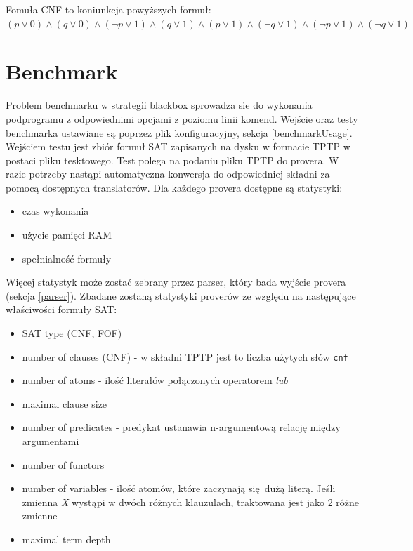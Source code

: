\documentclass[a4paper,12pt]{article}
\begin{document}
\noindent
Fomuła \gls{CNF} to koniunkcja powyższych formuł: $
(p \lor 0) \land (q \lor 0) \land
(\lnot p \lor 1) \land (q \lor 1) \land
(p \lor 1) \land (\lnot q \lor 1) \land
(\lnot p \lor 1) \land (\lnot q \lor 1)
$

\section{Benchmark}

Problem benchmarku w strategii blackbox sprowadza sie do wykonania podprogramu z odpowiednimi opcjami z poziomu linii komend.
Wejście oraz testy benchmarka ustawiane są poprzez plik konfiguracyjny, sekcja \ref{benchmarkUsage}.  Wejściem testu jest zbiór formuł \gls{SAT} zapisanych na dysku w formacie TPTP w postaci pliku tesktowego. Test polega na podaniu pliku TPTP do provera. W razie potrzeby nastąpi automatyczna konwersja do odpowiedniej składni za pomocą dostępnych translatorów.
Dla każdego provera dostępne są statystyki:

\begin{itemize}
  \item czas wykonania
  \item użycie pamięci RAM
  \item spełnialność formuły
\end{itemize}

\noindent
Więcej statystyk może zostać zebrany przez parser, który bada wyjście provera (sekcja \ref{parser}).
\newline
Zbadane zostaną statystyki proverów ze względu na następujące właściwości formuły SAT:

\begin{itemize}
  \item SAT type (CNF, FOF)
  \item number of clauses (CNF) - w składni TPTP jest to liczba użytych słów \texttt{cnf}
  \item number of atoms - ilość literałów połączonych operatorem \textit{lub}
  \item maximal clause size
  \item number of predicates - predykat ustanawia n-argumentową relację między argumentami
  \item number of functors
  \item number of variables - ilość atomów, które zaczynają się dużą literą. Jeśli zmienna \textit{X} wystąpi w dwóch różnych klauzulach, traktowana jest jako 2 różne zmienne
  \item maximal term depth
\end{itemize}
\end{document}
